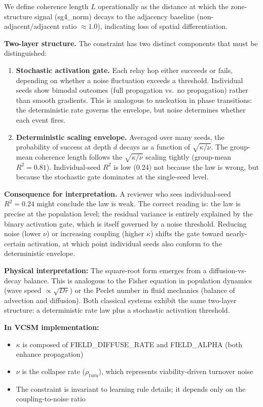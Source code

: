 \documentclass[11pt]{article}
\begin{document}
\noindent We define coherence length $L$ operationally as the distance at which the zone-structure signal (sg4\_norm) decays to the adjacency baseline (non-adjacent/adjacent ratio $\approx 1.0$), indicating loss of spatial differentiation.

\textbf{Two-layer structure.}
The constraint has two distinct components that must be distinguished:
\begin{enumerate}
  \item \textbf{Stochastic activation gate.} Each relay hop either succeeds or fails, depending on whether
    a noise fluctuation exceeds a threshold. Individual seeds show bimodal outcomes (full propagation vs.\ no
    propagation) rather than smooth gradients. This is analogous to nucleation in phase transitions: the
    deterministic rate governs the envelope, but noise determines whether each event fires.
  \item \textbf{Deterministic scaling envelope.} Averaged over many seeds, the probability of success at
    depth $d$ decays as a function of $\sqrt{\kappa/\nu}$. The group-mean coherence length follows the
    $\sqrt{\kappa/\nu}$ scaling tightly (group-mean $R^2 = 0.81$). Individual-seed $R^2$ is low (0.24) not
    because the law is wrong, but because the stochastic gate dominates at the single-seed level.
\end{enumerate}

\textbf{Consequence for interpretation.}
A reviewer who sees individual-seed $R^2 = 0.24$ might conclude the law is weak. The correct reading is:
the law is precise at the population level; the residual variance is entirely explained by the binary
activation gate, which is itself governed by a noise threshold. Reducing noise (lower $\nu$) or increasing
coupling (higher $\kappa$) shifts the gate toward nearly-certain activation, at which point individual seeds
also conform to the deterministic envelope.

\textbf{Physical interpretation:} The square-root form emerges from a diffusion-vs-decay balance. This is analogous to the Fisher equation in population dynamics (wave speed $\propto \sqrt{D r}$) or the Peclet number in fluid mechanics (balance of advection and diffusion). Both classical systems exhibit the same two-layer structure: a deterministic rate law plus a stochastic activation threshold.

\textbf{In VCSM implementation:}
\begin{itemize}
  \item $\kappa$ is composed of FIELD\_DIFFUSE\_RATE and FIELD\_ALPHA (both enhance propagation)
  \item $\nu$ is the collapse rate ($\rho_{\text{turn}}$), which represents viability-driven turnover noise
  \item The constraint is invariant to learning rule details; it depends only on the coupling-to-noise ratio
\end{itemize}
\end{document}
